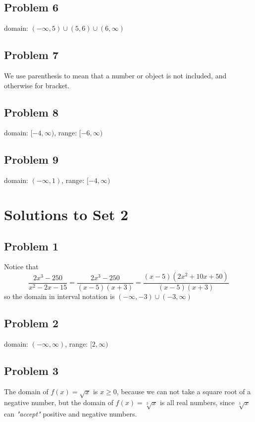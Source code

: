 \documentclass[12pt]{article}
\begin{document}
\subsection*{Problem 6}
domain: \((-\infty,5)\cup(5,6)\cup(6,\infty)\)
\subsection*{Problem 7}
We use parenthesis to mean that a number or object is not included, and otherwise for bracket.
\subsection*{Problem 8}
domain: \([-4,\infty)\), range: \([-6,\infty)\)
\subsection*{Problem 9}
domain: \((-\infty,1)\), range: \([-4,\infty)\)

\section*{Solutions to Set 2}
\subsection*{Problem 1}
Notice that
\[\dfrac{2x^3-250}{x^2-2x-15}=\dfrac{2x^3-250}{(x-5)(x+3)}=\dfrac{(x-5)(2x^2+10x+50)}{(x-5)(x+3)}\]
so the domain in interval notation is \((-\infty,-3)\cup (-3,\infty)\)
\subsection*{Problem 2}
domain: \((-\infty,\infty)\), range: \([2,\infty)\)
\subsection*{Problem 3}
The domain of \(f(x)=\sqrt{x}\) is \(x \geq 0\), because we can not take a square root of a negative number, but the domain of \(f(x)=\sqrt[3]{x}\) is all real numbers, since \(\sqrt[3]{x}\) can \textit{"accept"} positive and negative numbers.
\end{document}
